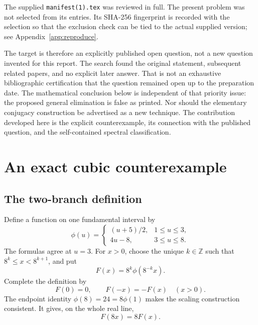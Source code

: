 \documentclass[11pt,letterpaper]{article}
\theoremstyle{definition}
\theoremstyle{remark}
\newcommand{\Z}{\mathbb Z}
\begin{document}
The supplied \texttt{manifest(1).tex} was reviewed in full. The present
problem was not selected from its entries. Its SHA-256 fingerprint is
recorded with the selection so that the exclusion check can be tied to the
actual supplied version; see Appendix~\ref{app:reproduce}.

The target is therefore an explicitly published open question, not a new
question invented for this report. The search found the original statement,
subsequent related papers, and no explicit later answer. That is not an
exhaustive bibliographic certification that the question remained open up
to the preparation date. The mathematical conclusion below is independent
of that priority issue: the proposed general elimination is false as
printed. Nor should the elementary conjugacy construction be advertised as
a new technique. The contribution developed here is the explicit
counterexample, its connection with the published question, and the
self-contained spectral classification.

\section{An exact cubic counterexample}
\label{sec:cubic}

\subsection{The two-branch definition}

Define a function on one fundamental interval by
\begin{equation}
  \phi(u)=
  \begin{cases}
    (u+5)/2,&1\le u\le3,\\
    4u-8,&3\le u\le8.
  \end{cases}
  \label{eq:phi}
\end{equation}
The formulas agree at $u=3$. For $x>0$, choose the unique $k\in\Z$ such that
$8^k\le x<8^{k+1}$, and put
\begin{equation}
  F(x)=8^k\phi(8^{-k}x).
  \label{eq:Fpos}
\end{equation}
Complete the definition by
\begin{equation}
  F(0)=0,\qquad F(-x)=-F(x)\quad(x>0).
  \label{eq:Fodd}
\end{equation}
The endpoint identity $\phi(8)=24=8\phi(1)$ makes the scaling construction
consistent. It gives, on the whole real line,
\begin{equation}
  F(8x)=8F(x).
  \label{eq:scale}
\end{equation}
\end{document}
